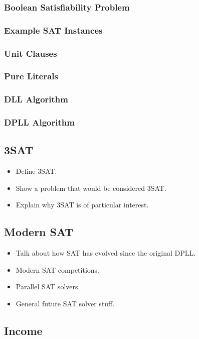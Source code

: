 \documentclass{article}
\begin{document}
\subsubsection{Boolean Satisfiability Problem}
\lipsum[1-2]
\subsubsection{Example SAT Instances}
\lipsum[1-2]
\subsubsection{Unit Clauses}
\lipsum[1-2]
\subsubsection{Pure Literals}
\lipsum[1-2]
\subsubsection{DLL Algorithm}
\lipsum[1-2]
\subsubsection{DPLL Algorithm}
\lipsum[1-2]

\subsection{3SAT}
\begin{itemize}
    \item Define 3SAT.
    \item Show a problem that would be considered 3SAT.
    \item Explain why 3SAT is of particular interest.
\end{itemize}

\subsection{Modern SAT}
\begin{itemize}
    \item Talk about how SAT has evolved since the original DPLL.
    \item Modern SAT competitions.
    \item Parallel SAT solvers.
    \item General future SAT solver stuff.
\end{itemize}

\subsection{Income}
\end{document}
